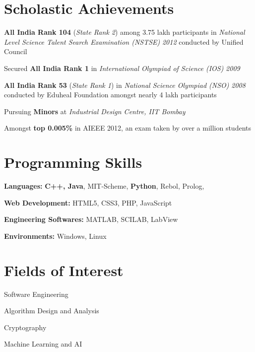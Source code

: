 \documentclass[margin,11pt]{resume}
\begin{document}
\begin{resume}
\section{\mysidestyle Scholastic Achievements}
\begin{list2}
\item \textbf{All India Rank 104} (\textsl{State Rank 2}) among 3.75 lakh participants in \textsl{National Level Science Talent Search Examination (NSTSE)} \textsl{2012} conducted by Unified Council
\item Secured \textbf{All India Rank 1} in \textsl{International Olympiad of Science (IOS)} \textsl{2009}
\item \textbf{All India Rank 53} (\textsl{State Rank 1}) in \textsl{National Science Olympiad (NSO)} \textsl{2008} conducted by Eduheal Foundation amongst nearly 4 lakh participants
\item Pursuing \textbf{Minors} at \textsl{Industrial Design Centre, IIT Bombay}
\item Amongst \textbf{top 0.005\%} in AIEEE 2012, an exam taken by over a million students
 \end{list2}
 
\section{\mysidestyle Programming Skills}
\begin{list2}
\item \textbf{Languages:} \textbf{C++, Java}, MIT-Scheme, \textbf{Python}, Rebol, Prolog, \LaTeXe{}
\item \textbf{Web Development:} HTML5, CSS3, PHP, JavaScript
\item \textbf{Engineering Softwares:} MATLAB, SCILAB, LabView
\item \textbf{Environments:} Windows, Linux
\end{list2}

\section{\mysidestyle Fields of Interest}
\begin{list2}
\item Software Engineering
\item Algorithm Design and Analysis
\item Cryptography
\item Machine Learning and AI
\end{list2}


\end{resume}
\end{document}
